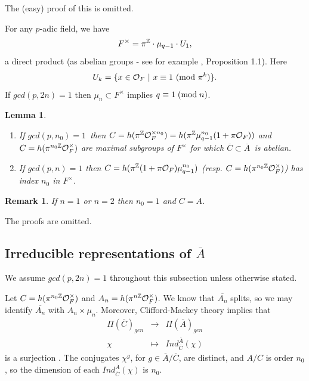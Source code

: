 \documentclass[twocolumn,10pt]{article}
\newtheorem{lemma}[theorem]{Lemma}
\newtheorem{remark}{Remark}
\begin{document}
The (easy) proof of this is omitted.

For any $p$-adic field, we have
\[
F^{\times }=\pi ^{{\Bbb Z}}\cdot \mu _{q-1}\cdot U_1, 
\]
a direct product (as abelian groups - see
for example \cite{N}, Proposition 1.1). Here 
\[
U_k=\{x\in {\cal O}_F\ |\ x\equiv 1\  ({\rm mod}\ \pi^k )\}.
\]
If $gcd(p,2n)=1$ then $\mu _n\subset F^{\times }$ implies
$q\equiv 1\;({\rm mod}\;n)$.

\begin{lemma}
\begin{enumerate}
\item[(a)] If $gcd(p,n_0)=1$\ then 
$C=h(\pi ^{{\Bbb Z}}{\cal O}_F^{\times n_0})=
h(\pi ^{{\Bbb Z}}\mu_{q-1}^{n_0}(1+\pi {\cal O}_F))$
and $C=h(\pi ^{{n_0\Bbb Z}}{\cal O}_F^\times )$
are maximal subgroups of 
$F^{\times }$ for which 
$\overline{C}\subset \overline{A}$\ is abelian.

\item[(b)]
If $gcd(p,n)=1$
then $C=h(\pi ^{{\Bbb Z}}(1+\pi {\cal O}_F)\mu _{q-1}^{n_0})$ 
(resp. $C=h(\pi ^{{n_0\Bbb Z}}{\cal O}_F^\times )$)
has index $n_0$ in $F^{\times }$.
\end{enumerate}
\end{lemma}

\begin{remark}
If $n=1$ or $n=2$ then $n_0=1$ and $C=A$.
\end{remark}

The proofs are omitted.

\subsection{Irreducible representations of $\overline{A}$}

\label{subsubsec:4.2.1}

We assume $gcd(p,2n)=1$ throughout this subsection unless otherwise
stated. 

Let $C=h(\pi ^{{n_0\Bbb Z}}{\cal O}_F^\times )$ and 
$A_n=h(\pi ^{{n\Bbb Z}}{\cal O}_F^\times )$. We know that
$\overline{A_n}$ splits, so we may identify
$\overline{A_n}$ with $A_n\times \mu_n$. Moreover,
Clifford-Mackey theory implies that
\[
\begin{array}{ccc}
\Pi(\overline{C})_{gen} &\rightarrow &\Pi(\overline{A})_{gen}\\
\chi & \longmapsto & Ind_{\overline{C}}^{\overline{A}}(\chi)
\end{array}
\]
is a surjection \cite{Mo1}. The conjugates $\chi^{g}$, for 
$g\in \overline{A}/\overline{C}$, are distinct,
and $A/C$ is order $n_0$, so the dimension of each 
$Ind_{\overline{C}}^{\overline{A}}(\chi)$ is $n_0$.
\end{document}
